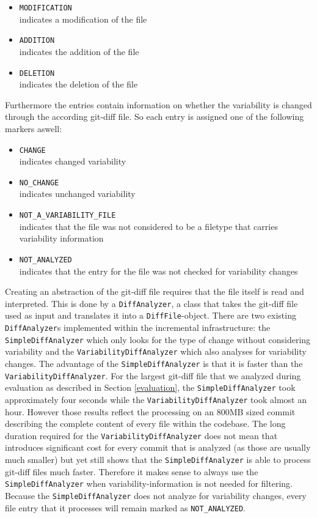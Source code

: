 \documentclass[a4paper]{article}
\begin{document}
\begin{itemize}
	\item \texttt{MODIFICATION} \\
	      indicates a modification of the file
	\item \texttt{ADDITION} \\
	      indicates the addition of the file
	\item \texttt{DELETION} \\
	      indicates the deletion of the file
\end{itemize}

Furthermore the entries contain information on whether the variability is changed through the according git-diff file. So each entry is assigned one of the following markers aswell:

\begin{itemize}
	\item \texttt{CHANGE} \\
	      indicates changed variability
	\item \texttt{NO\_CHANGE} \\
	      indicates unchanged variability
	\item \texttt{NOT\_A\_VARIABILITY\_FILE}\\
	      indicates that the file was not considered to be a filetype that carries variability information
	\item \texttt{NOT\_ANALYZED}\\
	      indicates that the entry for the file was not checked for variability changes
\end{itemize}

Creating an abstraction of the git-diff file requires that the file itself is read and interpreted. This is done by a \texttt{DiffAnalyzer}, a class that takes the git-diff file used as input and translates it into a \texttt{DiffFile}-object. There are two existing \texttt{DiffAnalyzer}s implemented within the incremental infrastructure: the \texttt{Simple\-Diff\-Analyzer} which only looks for the type of change without considering variability and the \texttt{Variability\-Diff\-Analyzer} which also analyses for variability changes. The advantage of the \texttt{Simple\-Diff\-Analyzer} is that it is faster than the \texttt{Variability\-Diff\-Analyzer}. For the largest git-diff file that we analyzed during evaluation as described in Section \ref{evaluation}, the \texttt{Simple\-Diff\-Analyzer} took approximately four seconds while the \texttt{Variability\-Diff\-Analyzer} took almost an hour. However those results reflect the processing on an 800MB sized commit describing the complete content of every file within the codebase. The long duration required for the \texttt{Variability\-Diff\-Analyzer} does not mean that introduces significant cost for every commit that is analyzed (as those are usually much smaller) but yet still shows that the \texttt{Simple\-Diff\-Analyzer} is able to process git-diff files much faster.
Therefore it makes sense to always use the \texttt{Simple\-Diff\-Analyzer} when variability-information is not needed for filtering. Because the \texttt{Simple\-Diff\-Analyzer} does not analyze for variability changes, every file entry that it processes will remain marked as \texttt{NOT\_ANALYZED}.
\end{document}
